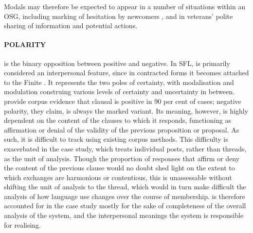 \setlength{\columnsep}{-5mm}
\begin{multicols}{3}\raggedright{
\begin{quote}

\end{quote}
\begin{quote}

\end{quote}
\begin{quote}

\end{quote}
}
\end{multicols}
%
Modals may therefore be expected to appear in a number of situations within an \gls{OSG}, including marking of hesitation by newcomers \cite{vayreda_social_2009,weber_missed_2011}, and in veterans' polite sharing of information and potential actions.

\paragraph{POLARITY}

 is the binary opposition between positive and negative. In \gls{SFL},  is primarily considered an interpersonal feature, since in contracted forms it becomes attached to the Finite \cite[p.~143]{halliday_introduction_2004}. It represents the two poles of certainty, with modalisation and modulation construing various levels of certainty and uncertainty in between. \textcite{halliday_introduction_2004} provide corpus evidence that clausal  is positive in 90 per cent of cases; negative polarity, they claim, is always the marked variant. Its meaning, however, is highly dependent on the content of the clauses to which it responds, functioning as affirmation or denial of the validity of the previous proposition or proposal. As such, it is difficult to track using existing corpus methods. This difficulty is exacerbated in the case study, which treats individual \glspl{post}, rather than \glspl{thread}, as the unit of analysis. Though the proportion of responses that affirm or deny the content of the previous clause would no doubt shed light on the extent to which exchanges are harmonious or contentious, this is unassessable without shifting the unit of analysis to the \gls{thread}, which would in turn make difficult the analysis of how language use changes over the course of membership.  is therefore accounted for in the case study mostly for the sake of completeness of the overall analysis of the  system, and the interpersonal meanings the system is responsible for realising.

